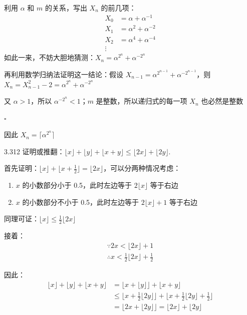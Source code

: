 利用 \( \alpha \) 和 \( m \) 的关系，写出 \( X_n \) 的前几项：
\begin{align*}
  X_0 &= \alpha + \alpha^{-1} \\
  X_1 &= \alpha^2 + \alpha^{-2} \\
  X_2 &= \alpha^4 + \alpha^{-4} \\
  \vdots
\end{align*}
如此一来，不妨大胆地猜测：\( X_n = \alpha^{2^n} + \alpha^{-2^{n}} \)

再利用数学归纳法证明这一结论：假设 \( X_{n-1} = \alpha^{2^{n-1}} + \alpha^{-2^{n-1}} \)，则 \( X_n = X_{n-1}^2 -2 = \alpha^{2^n} + \alpha^{-2^{n}} \)

又 \( \alpha > 1 \)，所以 \( \alpha^{-2^{n}} < 1 \)；\( m \) 是整数，所以递归式的每一项 \( X_n \) 也必然是整数

\hfill \( \square \)

因此 \( X_n = \lceil \alpha^{2^n} \rceil \)

\begin{problem}{3.31}{2}
  证明或推翻：\( \lfloor x \rfloor + \lfloor y \rfloor + \lfloor x+y \rfloor \le \lfloor 2x \rfloor + \lfloor 2y \rfloor \).
\end{problem}

首先证明：\( \lfloor x \rfloor + \lfloor x + \frac{1}{2} \rfloor = \lfloor 2x \rfloor \)，可以分两种情况考虑：
\begin{enumerate}
  \item \( x \) 的小数部分小于 0.5，此时左边等于 \( 2 \lfloor x \rfloor \) 等于右边
  \item \( x \) 的小数部分不小于 0.5，此时左边等于 \( 2 \lfloor x \rfloor + 1 \) 等于右边
\end{enumerate}
同理可证：\( \lfloor x \rfloor \le \frac{1}{2} \lfloor 2x \rfloor \)

接着：
\begin{gather*}
  \because 2x < \lfloor 2x \rfloor + 1 \\
  \therefore x < \frac{1}{2} \lfloor 2x \rfloor + \frac{1}{2}
\end{gather*}

因此：
\begin{align*}
  \lfloor x \rfloor + \lfloor y \rfloor + \lfloor x+y \rfloor &= \lfloor x + \lfloor y \rfloor \rfloor + \lfloor x + y \rfloor \\
  &\le \lfloor x + \frac{1}{2} \lfloor 2y \rfloor \rfloor + \lfloor x + \frac{1}{2} \lfloor 2y \rfloor + \frac{1}{2} \rfloor \\
  &= \lfloor 2x + \lfloor 2y \rfloor \rfloor = \lfloor 2x \rfloor + \lfloor 2y \rfloor
\end{align*}

